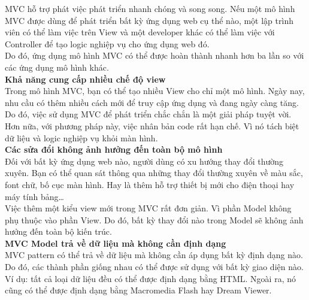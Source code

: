 MVC hỗ trợ phát việc phát triển nhanh chóng và song song. Nếu một mô hình MVC được dùng để phát triển bất kỳ ứng dụng web cụ thể nào, một lập trình viên có thể làm việc trên View và một developer khác có thể làm việc với Controller để tạo logic nghiệp vụ cho ứng dụng web đó.\\

Do đó, ứng dụng mô hình MVC có thể được hoàn thành nhanh hơn ba lần so với các ứng dụng mô hình khác.\\

\textbf{Khả năng cung cấp nhiều chế độ view}\\

Trong mô hình MVC, bạn có thể tạo nhiều View cho chỉ một mô hình. Ngày nay, nhu cầu có thêm nhiều cách mới để truy cập ứng dụng và đang ngày càng tăng. Do đó, việc sử dụng MVC để phát triển chắc chắn là một giải pháp tuyệt vời.\\

Hơn nữa, với phương pháp này, việc nhân bản code rất hạn chế. Vì nó tách biệt dữ liệu và logic nghiệp vụ khỏi màn hình.\\

\textbf{Các sửa đổi không ảnh hưởng đến toàn bộ mô hình}\\

Đối với bất kỳ ứng dụng web nào, người dùng có xu hướng thay đổi thường xuyên. Bạn có thể quan sát thông qua những thay đổi thường xuyên về màu sắc, font chữ, bố cục màn hình. Hay là thêm hỗ trợ thiết bị mới cho điện thoại hay máy tính bảng…\\

Việc thêm một kiểu view mới trong MVC rất đơn giản. Vì phần Model không phụ thuộc vào phần View. Do đó, bất kỳ thay đổi nào trong Model sẽ không ảnh hưởng đến toàn bộ kiến trúc.\\

\textbf{MVC Model trả về dữ liệu mà không cần định dạng}\\

MVC pattern có thể trả về dữ liệu mà không cần áp dụng bất kỳ định dạng nào. Do đó, các thành phần giống nhau có thể được sử dụng với bất kỳ giao diện nào.\\

Ví dụ: tất cả loại dữ liệu đều có thể được định dạng bằng HTML. Ngoài ra, nó cũng có thể được định dạng bằng Macromedia Flash hay Dream Viewer.\\
